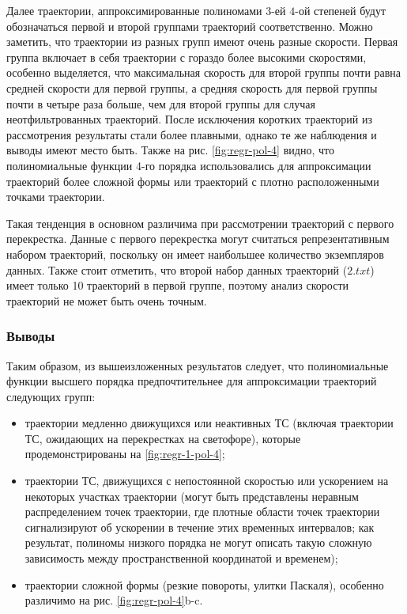 Далее траектории, аппроксимированные полиномами $3$-ей $4$-ой степеней будут обозначаться первой и второй группами траекторий соответственно. Можно заметить, что траектории из разных групп имеют очень разные скорости. Первая группа включает в себя траектории с гораздо более высокими скоростями, особенно выделяется, что максимальная скорость для второй группы почти равна средней скорости для первой группы, а средняя скорость для первой группы почти в четыре раза больше, чем для второй группы для случая неотфильтрованных траекторий. После исключения коротких траекторий из рассмотрения результаты стали более плавными, однако те же наблюдения и выводы имеют место быть. Также на рис. \ref{fig:regr-pol-4} видно, что полиномиальные функции 4-го порядка использовались для аппроксимации траекторий более сложной формы или траекторий с плотно расположенными точками траектории.

Такая тенденция в основном различима при рассмотрении траекторий с первого перекрестка. Данные с первого перекрестка могут считаться репрезентативным набором траекторий, поскольку он имеет наибольшее количество экземпляров данных. Также стоит отметить, что второй набор данных траекторий ($2.txt$) имеет только 10 траекторий в первой группе, поэтому анализ скорости траекторий не может быть очень точным.

\subsubsection{Выводы}

Таким образом, из вышеизложенных результатов следует, что полиномиальные функции высшего порядка предпочтительнее для аппроксимации траекторий следующих групп:

\begin{itemize}
	\item траектории медленно движущихся или неактивных ТС (включая траектории ТС, ожидающих на перекрестках на светофоре), которые продемонстрированы на \ref{fig:regr-1-pol-4};
	\item траектории ТС, движущихся с непостоянной скоростью или ускорением на некоторых участках траектории (могут быть представлены неравным распределением точек траектории, где плотные области точек траектории сигнализируют об ускорении в течение этих временных интервалов; как результат, полиномы низкого порядка не могут описать такую сложную зависимость между пространственной координатой и временем);
	\item траектории сложной формы (резкие повороты, улитки Паскаля), особенно различимо на рис. \ref{fig:regr-pol-4}b-c.
\end{itemize}

